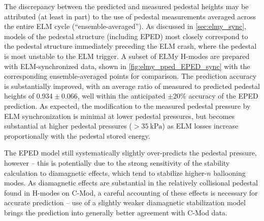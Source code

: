 The discrepancy between the predicted and measured pedestal heights may be attributed (at least in part) to the use of pedestal measurements averaged across the entire ELM cycle (``ensemble-averaged'').  As discussed in \cref{sec:elmy_sync}, models of the pedestal structure (including EPED) most closely correspond to the pedestal structure immediately preceding the ELM crash, where the pedestal is most unstable to the ELM trigger.  A subset of ELMy H-modes are prepared with ELM-synchronized data, shown in \cref{fig:elmy_pped_EPED_sync} with the corresponding ensemble-averaged points for comparison.  The prediction accuracy is substantially improved, with an average ratio of measured to predicted pedestal heights of $0.934 \pm 0.066$, well within the anticipated $\pm 20\%$ accuracy of the EPED prediction.  As expected, the modification to the measured pedestal pressure by ELM synchronization is minimal at lower pedestal pressures, but becomes substantial at higher pedestal pressures ($> \SI{35}{\kilo\pascal}$) as ELM losses increase proportionally with the pedestal stored energy.

The EPED model still systematically slightly over-predicts the pedestal pressure, however -- this is potentially due to the strong sensitivity of the stability calculation to diamagnetic effects, which tend to stabilize higher-$n$ ballooning modes.  As diamagnetic effects are substantial in the relatively collisional pedestal found in H-modes on C-Mod, a careful accounting of these effects is necessary for accurate prediction -- use of a slightly weaker diamagnetic stabilization model brings the prediction into generally better agreement with C-Mod data.

\begin{figure}[t]
 \pushtooutside
\end{figure}

